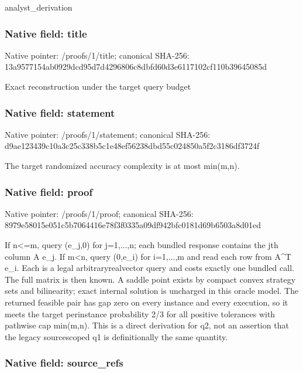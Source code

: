\documentclass[10pt,a4paper]{article}
\begin{document}
analyst\_derivation


\subsubsection{Native field: title}


Native pointer: /proofs/1/title; canonical SHA-256: 13a9577154ab0929dcd95d7d\allowbreak{}4296806c8dbfd60d3e611710\allowbreak{}2cf110b39645085d


Exact reconstruction under the target query budget


\subsubsection{Native field: statement}


Native pointer: /proofs/1/statement; canonical SHA-256: d9ae123439c10a3c25c338b5\allowbreak{}c1e48ef56238dbd55c024850\allowbreak{}a5f2c3186df3724f


The target randomized accuracy complexity is at most min(m,n).


\subsubsection{Native field: proof}


Native pointer: /proofs/1/proof; canonical SHA-256: 8979e58015e051c5b7064416\allowbreak{}e78f3f0335a09df942bfc018\allowbreak{}1d69b6503a8d01ed


If n<=m, query (e\_j,0) for j=1,...,n; each bundled response contains the jth column A e\_j. If m<n, query (0,e\_i) for i=1,...,m and read each row from A\textasciicircum{}T e\_i. Each is a legal arbitraryrealvector query and costs exactly one bundled call. The full matrix is then known. A saddle point exists by compact convex strategy sets and bilinearity; exact internal solution is uncharged in this oracle model. The returned feasible pair has gap zero on every instance and every execution, so it meets the target perinstance probability 2/3 for all positive tolerances with pathwise cap min(m,n). This is a direct derivation for q2, not an assertion that the legacy sourcescoped q1 is definitionally the same quantity.


\subsubsection{Native field: source\_refs}
\end{document}
